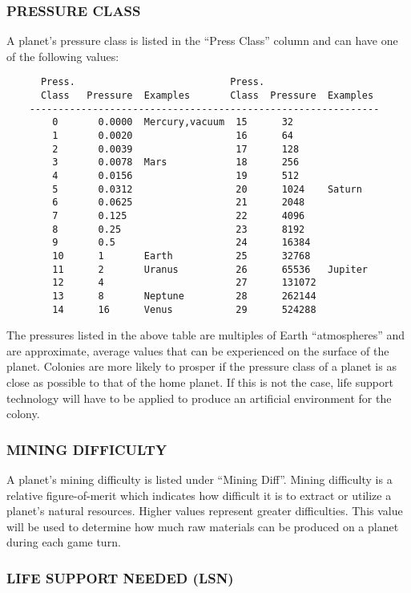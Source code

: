 \documentclass[10pt,titlepage]{article}
\begin{document}
\subsubsection{PRESSURE CLASS}

A planet's pressure class is listed in the ``Press Class'' column and can have
one of the following values:
\begin{verbatim}
      Press.                           Press.
      Class   Pressure  Examples       Class  Pressure  Examples
    -------------------------------------------------------------
        0       0.0000  Mercury,vacuum  15      32
        1       0.0020                  16      64
        2       0.0039                  17      128
        3       0.0078  Mars            18      256
        4       0.0156                  19      512
        5       0.0312                  20      1024    Saturn
        6       0.0625                  21      2048
        7       0.125                   22      4096
        8       0.25                    23      8192
        9       0.5                     24      16384
        10      1       Earth           25      32768
        11      2       Uranus          26      65536   Jupiter
        12      4                       27      131072
        13      8       Neptune         28      262144
        14      16      Venus           29      524288
\end{verbatim}
The pressures listed in the above table are multiples of Earth ``atmospheres''
and are approximate, average values that can be experienced on the surface of
the planet.  Colonies are more likely to prosper if the pressure class of a
planet is as close as possible to that of the home planet.  If this is not the
case, life support technology will have to be applied to produce an artificial
environment for the colony.


\subsubsection{MINING DIFFICULTY}

A planet's mining difficulty is listed under ``Mining Diff''.  Mining difficulty
is a relative figure-of-merit which indicates how difficult it is to extract
or utilize a planet's natural resources.  Higher values represent greater
difficulties.  This value will be used to determine how much raw materials
can be produced on a planet during each game turn.


\subsubsection{LIFE SUPPORT NEEDED (LSN)}
\end{document}
